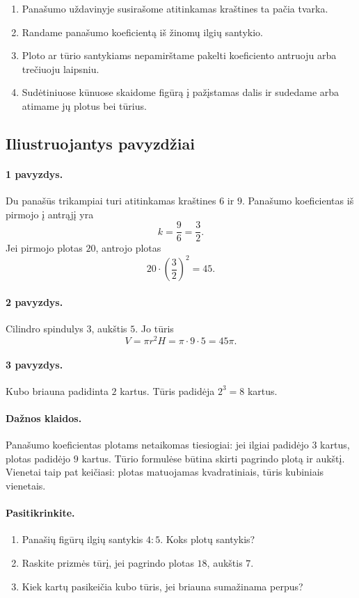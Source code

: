 \begin{enumerate}
\item Panašumo uždavinyje susirašome atitinkamas kraštines ta pačia tvarka.
\item Randame panašumo koeficientą iš žinomų ilgių santykio.
\item Ploto ar tūrio santykiams nepamirštame pakelti koeficiento antruoju arba trečiuoju laipsniu.
\item Sudėtiniuose kūnuose skaidome figūrą į pažįstamas dalis ir sudedame arba atimame jų plotus bei tūrius.
\end{enumerate}

\subsection{Iliustruojantys pavyzdžiai}

\paragraph{1 pavyzdys.}
Du panašūs trikampiai turi atitinkamas kraštines $6$ ir $9$. Panašumo koeficientas iš pirmojo į antrąjį yra
\[
k=\frac{9}{6}=\frac32.
\]
Jei pirmojo plotas $20$, antrojo plotas
\[
20\cdot\left(\frac32\right)^2=45.
\]

\paragraph{2 pavyzdys.}
Cilindro spindulys $3$, aukštis $5$. Jo tūris
\[
V=\pi r^2H=\pi\cdot9\cdot5=45\pi.
\]

\paragraph{3 pavyzdys.}
Kubo briauna padidinta $2$ kartus. Tūris padidėja $2^3=8$ kartus.

\paragraph{Dažnos klaidos.}
Panašumo koeficientas plotams netaikomas tiesiogiai: jei ilgiai padidėjo $3$ kartus, plotas padidėjo $9$ kartus. Tūrio formulėse būtina skirti pagrindo plotą ir aukštį. Vienetai taip pat keičiasi: plotas matuojamas kvadratiniais, tūris kubiniais vienetais.

\paragraph{Pasitikrinkite.}
\begin{enumerate}
\item Panašių figūrų ilgių santykis $4:5$. Koks plotų santykis?
\item Raskite prizmės tūrį, jei pagrindo plotas $18$, aukštis $7$.
\item Kiek kartų pasikeičia kubo tūris, jei briauna sumažinama perpus?
\end{enumerate}

